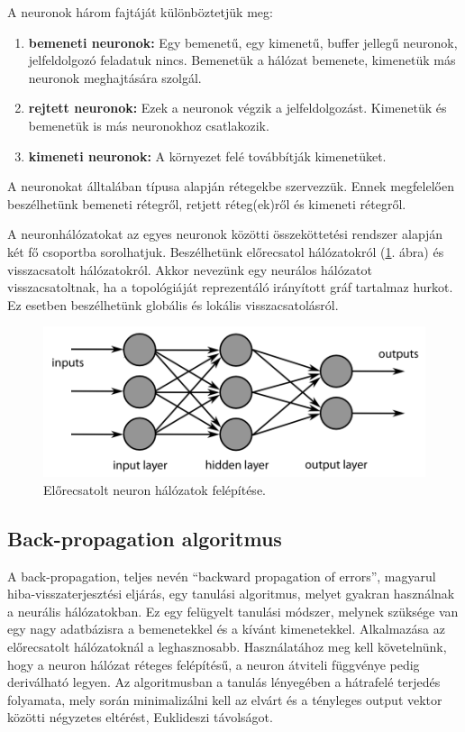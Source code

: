 \documentclass[a4paper]{article}
\begin{document}
A neuronok három fajtáját különböztetjük meg:
\begin{enumerate}
    \item\textbf{bemeneti neuronok:} Egy bemenetű, egy kimenetű, buffer jellegű neuronok, jelfeldolgozó feladatuk nincs. Bemenetük a hálózat bemenete, kimenetük más neuronok meghajtására szolgál.
    \item\textbf{rejtett neuronok:} Ezek a neuronok végzik a jelfeldolgozást. Kimenetük és bemenetük is más neuronokhoz csatlakozik.
    \item\textbf{kimeneti neuronok:} A környezet felé továbbítják kimenetüket.
\end{enumerate}

A neuronokat álltalában típusa alapján rétegekbe szervezzük. Ennek megfelelően beszélhetünk bemeneti rétegről, retjett réteg(ek)ről és kimeneti rétegről.

A neuronhálózatokat az egyes neuronok közötti összeköttetési rendszer alapján két fő csoportba sorolhatjuk. Beszélhetünk előrecsatol hálózatokról (\ref{forward_neuron}. ábra) és visszacsatolt hálózatokról. Akkor nevezünk egy neurálos hálózatot visszacsatoltnak, ha a topológiáját reprezentáló irányított gráf tartalmaz hurkot. Ez esetben beszélhetünk globális és lokális visszacsatolásról.

\begin{figure}
  \centering
  \includegraphics[scale=0.3]{neuron_layers}
  \caption{Előrecsatolt neuron hálózatok felépítése.}
  \label{forward_neuron}
\end{figure}

\subsection{Back-propagation algoritmus}
A back-propagation, teljes nevén ``backward propagation of errors'', magyarul hiba-visszaterjesztési eljárás, egy tanulási algoritmus, melyet gyakran használnak a neurális hálózatokban. Ez egy felügyelt tanulási módszer, melynek szüksége van egy nagy adatbázisra a bemenetekkel és a kívánt kimenetekkel. Alkalmazása az előrecsatolt hálózatoknál a leghasznosabb. Használatához meg kell követelnünk, hogy a neuron hálózat réteges felépítésű, a neuron átviteli függvénye pedig deriválható legyen. Az algoritmusban a tanulás lényegében a hátrafelé terjedés folyamata, mely során minimalizálni kell az elvárt és a tényleges output vektor közötti négyzetes eltérést, Euklideszi távolságot.
\end{document}
